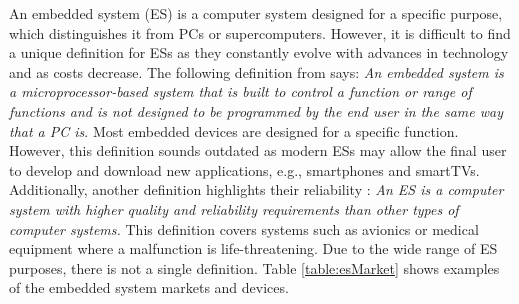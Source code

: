 An embedded system (ES) is a computer system designed for a specific purpose, which  distinguishes it from PCs or supercomputers. However, it is difficult to find a unique definition for ESs as they constantly evolve with advances in technology and as costs decrease. The following definition from \cite{heath2003} says: \textit{An embedded system is a microprocessor-based system that is built to control a function or range of functions and is not designed to be programmed by the end user in the same way that a PC is}. Most embedded devices are designed for a specific function. However, this definition sounds outdated as modern ESs may allow the final user to develop and download new applications, e.g., smartphones and smartTVs. Additionally, another definition highlights  their  reliability \cite{Noergaard2005}: \textit{An ES is a computer system with higher quality and reliability requirements than other types of computer systems.} This definition covers systems such as avionics or medical equipment where a malfunction is  life-threatening. Due to the wide range of ES purposes, there is not a single definition. Table \ref{table:esMarket} shows examples of the embedded system markets and devices.  

